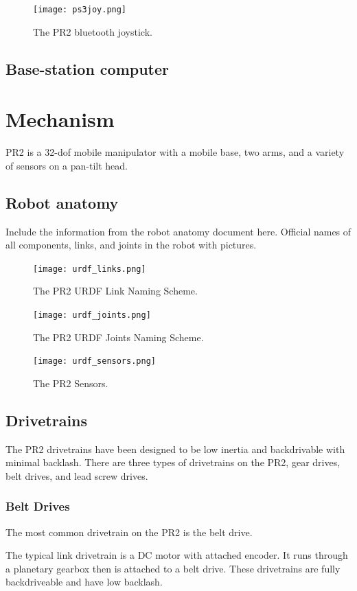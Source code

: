 \begin{figure}[h]
\centering
\texttt{[image: ps3joy.png]}
\caption{The PR2 bluetooth joystick.}
\label{fig:ps3joy}
\end{figure}

\subsection{Base-station computer}
\section{Mechanism}
PR2 is a 32-dof mobile manipulator with a mobile base, two arms, and a variety of sensors on a pan-tilt head.
\subsection{Robot anatomy}
Include the information from the robot anatomy document here.  Official names of all components, links, and 
joints in the robot with pictures.

\begin{figure}[!h]
\centering
\texttt{[image: urdf\_links.png]}
\caption{The PR2 URDF Link Naming Scheme.}
\label{fig:urdf_link_names}
\texttt{[image: urdf\_joints.png]}
\caption{The PR2 URDF Joints Naming Scheme.}
\label{fig:urdf_joints}
\texttt{[image: urdf\_sensors.png]}
\caption{The PR2 Sensors.}
\label{fig:urdf_sensor}
\end{figure}

\subsection{Drivetrains}
The PR2 drivetrains have been designed to be low inertia and
backdrivable with minimal backlash. There are three types of
drivetrains on the PR2, gear drives, belt drives, and lead screw
drives.  

\subsubsection{Belt Drives}
The most common drivetrain on the PR2 is the belt drive.  

The typical link drivetrain is a DC motor with attached encoder.  It
runs through a planetary gearbox then is attached to a belt
drive. These drivetrains are fully backdriveable and have low
backlash.

